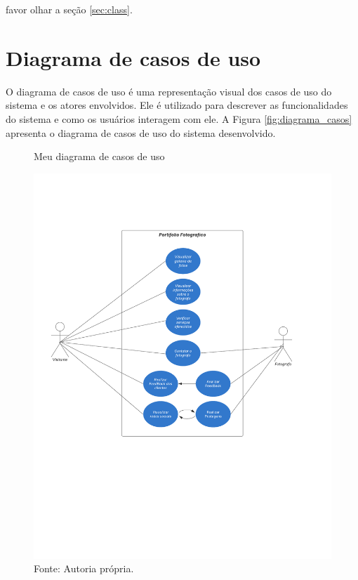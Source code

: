 favor olhar a seção \ref{sec:class}.


\section{Diagrama de casos de uso}
\label{sec:casos}
O diagrama de casos de uso é uma representação visual dos casos de uso do sistema e os atores envolvidos. Ele é utilizado para descrever as funcionalidades do sistema e como os usuários interagem com ele. A Figura \ref{fig:diagrama_casos} apresenta o diagrama de casos de uso do sistema desenvolvido.
\begin{figure} [h!]
    \centering
    \caption{Meu diagrama de casos de uso}
    \includegraphics[width=1.1\textwidth]{Figures/Diagrama_de_caso_de_uso.png}
    \caption*{Fonte: Autoria própria.}
    \label{fig:diagrama_de_casos_de_uso}
\end{figure}

